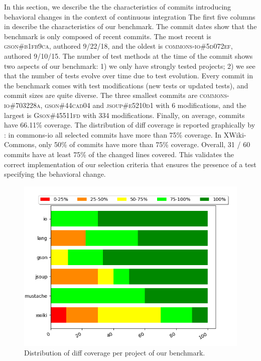 In  this section, we describe the the characteristics of commits introducing behavioral changes in the context of continuous integration
The first five columns in  describe the characteristics of our benchmark.
The commit dates show that the benchmark is only composed of recent commits.
The most recent is \textsc{gson\#b1fb9ca}, authored 9/22/18, and the oldest is \textsc{commons-io\#5d072ef}, authored 9/10/15.
The number of test methods at the time of the commit shows two aspects of our benchmark:
1) we only have strongly tested projects;
2) we see that the number of tests evolve over time
due to test evolution.
Every commit in the benchmark comes with test modifications (new tests or updated tests), and commit sizes are quite diverse.
The three smallest commits are \textsc{commons-io\#703228a}, \textsc{gson\#44cad04} and \textsc{jsoup\#e5210d1} with 6 modifications, and the largest is \textsc{Gson\#45511fd} with 334 modifications.
%
Finally, 
on average, commits have 66.11\% coverage. 
The distribution of diff coverage is reported graphically by : 
in commons-io all selected commits have more than 75\% coverage.
In XWiki-Commons, only 50\% of commits have more than 75\% coverage. Overall, 31 / 60 commits have at least 75\% of the changed lines covered.
This validates the correct implementation of our selection criteria that ensures the presence of a test specifying the behavioral change.

\begin{figure}
\centering
\includegraphics[width=.95\linewidth]{img/diff_cov_hist.png}
\caption{Distribution of diff coverage per project of our benchmark.}
\label{fig:histdiffcoverage}
\end{figure}

